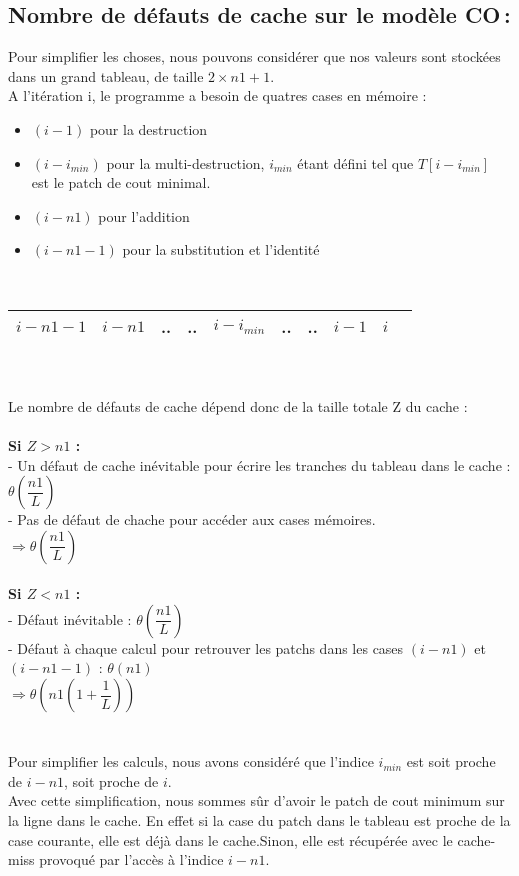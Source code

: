 \documentclass[a4paper, 10pt, french]{article}
\begin{document}
  \subsection{Nombre de défauts de cache sur le modèle CO\,: }
    Pour simplifier les choses, nous pouvons considérer que nos valeurs sont stockées dans un grand tableau, de taille $2 \times n1 + 1$.\\
    A l'itération i, le programme a besoin de quatres cases en mémoire :
    \begin{itemize}
    \item $(i-1)$ pour la destruction
    \item $(i - i_{min})$ pour la multi-destruction, $i_{min}$ étant défini tel que $T[i-i_{min}]$ est le patch de cout minimal.
    \item $(i - n1)$ pour l'addition
    \item $(i - n1 - 1)$ pour la substitution et l'identité \\
    \end{itemize}
    \ \ \ \ \ \ \ \ 
    \begin{tabular}{|c|c|c|c|c|c|c|c|c|c|}
    	\hline 
    	
    	 $i - n1 - 1$ & $i - n1$  &  .. & .. & $i - i_{min}$ & .. & .. & $i - 1$ & $i$ \\
    	 
    	\hline
    \end{tabular}
	 \\ \\
	Le nombre de défauts de cache dépend donc de la taille totale Z du cache :\\ \\
	\textbf{Si $Z > n1$ :} \\
		 - Un défaut de cache inévitable pour écrire les tranches du tableau dans le cache : $\theta(\dfrac{n1}{L})$ \\
		 - Pas de défaut de chache pour accéder aux cases mémoires. \\
		 $\Rightarrow \theta(\dfrac{n1}{L})$ \\ \\ 
	\textbf{Si $Z < n1$ :} \\
	- Défaut inévitable : $\theta(\dfrac{n1}{L})$ \\
	- Défaut à chaque calcul pour retrouver les patchs dans les cases $(i - n1)$ et  $(i - n1 - 1)$ : $\theta(n1)$ \\
 	$\Rightarrow \theta(n1 (1 + \dfrac{1}{L}) )$ \\ \\
 	\\
 	Pour simplifier les calculs, nous avons considéré que l'indice $i_{min}$ est soit proche de $i - n1$, soit proche de $i$. \\
 	Avec cette simplification, nous sommes sûr d'avoir le patch de cout minimum sur la ligne dans le cache. En effet si la case du patch dans
 	le tableau est proche
 	de la case courante,  elle est déjà dans le cache.Sinon, elle est récupérée avec le cache-miss provoqué par l'accès à l'indice
 	$i - n1$.
\end{document}
